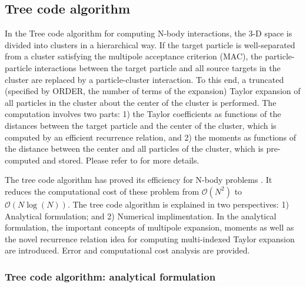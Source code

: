 \documentclass[draftclsnofoot]{elsarticle}
\begin{document}
\subsection{Tree code algorithm}
In the Tree code algorithm for computing N-body interactions, the 3-D space is divided into clusters in a hierarchical way. If the target particle is well-separated from a cluster satisfying the multipole acceptance criterion (MAC), the particle-particle interactions between the target particle and all source targets in the cluster are replaced by a particle-cluster interaction. To this end, a truncated (specified by ORDER, the number of terms of the expansion) Taylor expansion of all particles in the cluster about the center of the cluster is performed. The computation involves two parts: 1) the Taylor coefficients as functions of the distances between the target particle and the center of the cluster, which is computed by an efficient recurrence relation, and 2) the moments as functions of the distance between the center and all particles of the cluster, which is pre-computed and stored. Please refer to \cite{krasny1} for more details.     

The tree code algorithm has proved its efficiency for N-body problems \cite{barnes}. It reduces the computational cost of these problem from $\mathcal{O}(N^2)$ to $\mathcal{O}(N\log(N))$. 
The tree code algorithm is explained in  two perspectives: 
{\color{red}
1) Analytical formulation; and 2) Numerical implimentation.  
In the analytical formulation, the important concepts of multipole expansion, moments as well as the novel recurrence relation idea for computing multi-indexed Taylor expansion are introduced.  Error and computational cost analysis are provided.
}


\subsubsection{Tree code algorithm: analytical formulation}
\end{document}
